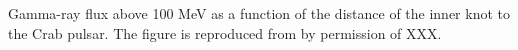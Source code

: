 \label{fig:knotgamma}
Gamma-ray flux above 100 MeV as a function of the distance of the inner knot to the Crab pulsar. The figure is reproduced from  \citet{rudy2015} by permission of XXX.